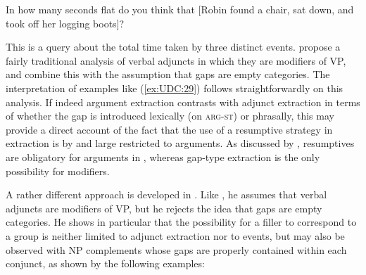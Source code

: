 \documentclass[output=paper
,notxmath 
 	        ,biblatex
                ,babelshorthands
                ,newtxmath
                ,draftmode
                ,colorlinks, citecolor=brown
]{langscibook}
\begin{document}
\begin{exe}
\ex \label{ex:UDC:29}
In how many seconds flat do you think that [Robin found a chair,
sat down, and took off her logging boots]?
\end{exe}

\noindent
This is a query about the total time taken by three distinct events.
\citeauthor{Levine:Hukari:06} propose a fairly traditional analysis of verbal
adjuncts in which they are modifiers of VP, and combine this with the
assumption that gaps are empty categories. The interpretation of
examples like (\ref{ex:UDC:29}) follows straightforwardly on this
analysis. If indeed argument extraction contrasts with adjunct
extraction in terms of whether the gap is introduced  lexically (on
\textsc{arg-st}) or phrasally, this may
provide a direct account of the fact that the use of a resumptive
strategy in extraction is by and large restricted to arguments. As
discussed by \citet{Crysmann:Reintges:14}, resumptives are obligatory
for arguments in , whereas gap-type extraction is the only
possibility for modifiers.
 

A rather different approach is developed in \citet{Chaves:09}. Like
\citet[Chapter~3]{Levine:Hukari:06}, he assumes that verbal adjuncts are
modifiers of VP, but he rejects the idea that gaps are empty
categories. He shows in particular that the possibility for a filler
to correspond to a group is neither limited to adjunct extraction nor
to events, but may also be observed with NP complements whose gaps are
properly contained within each conjunct, as shown by the following
examples:

\begin{exe} \ex \begin{xlist} \label{ex:UDC:31}


\end{xlist}
\end{exe}

\end{document}
